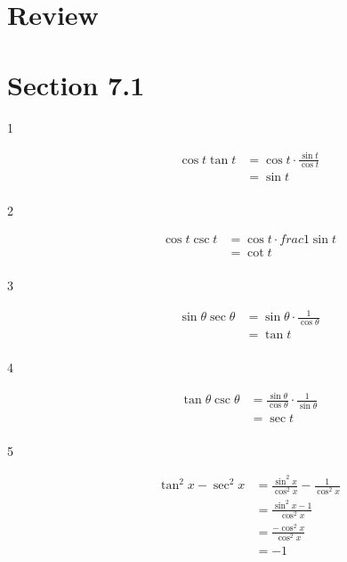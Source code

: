 \documentclass{exam}
\begin{document}
  \section{Review}

  \ifprintanswers
    \section{Section 7.1}
    \begin{description}

      \item[1] 
        \begin{align*}
          \cos t \tan t & = \cos t \cdot \frac{\sin t}{\cos t} \\
                        & = \boxed{ \sin t } \\
        \end{align*}

      \item[2] 
        \begin{align*}
          \cos t \csc t & = \cos t \cdot frac{1}{\sin t} \\
                        & = \boxed{ \cot t } \\
        \end{align*}

      \item[3] 
        \begin{align*}
          \sin \theta \sec \theta & = \sin \theta \cdot \frac{1}{\cos \theta} \\
                                  & = \boxed{ \tan t } \\
        \end{align*}

      \item[4] 
        \begin{align*}
          \tan \theta \csc \theta & = \frac{\sin \theta}{\cos \theta} \cdot \frac{1}{\sin \theta} \\
                                  & = \boxed{ \sec t } \\
        \end{align*}

      \item[5] 
        \begin{align*}
          \tan^2 x - \sec^2 x & = \frac{\sin^2 x}{\cos^2 x} - \frac{1}{\cos^2 x} \\
                              & = \frac{\sin^2 x - 1}{\cos^2 x} \\
                              & = \frac{- \cos^2 x}{\cos^2 x} \\
                              & = \boxed{ -1 } \\
        \end{align*}


\end{description}
\end{document}
